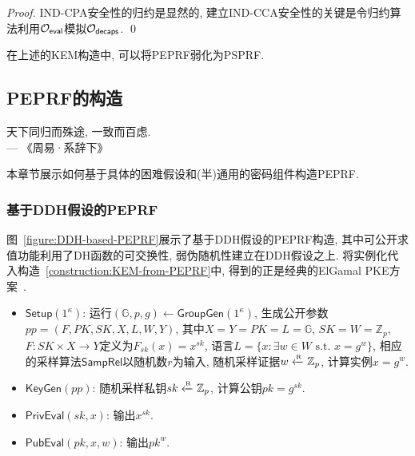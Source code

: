 \begin{proof}
IND-CPA安全性的归约是显然的, 建立IND-CCA安全性的关键是令归约算法利用$\mathcal{O}_\mathsf{eval}$模拟$\mathcal{O}_\mathsf{decaps}$. \qed
\end{proof}

\begin{remark}
在上述的KEM构造中, 可以将PEPRF弱化为PSPRF. 
\end{remark}

\subsection{PEPRF的构造}
\begin{center}
    天下同归而殊途, 一致而百虑.  \\
                \hfill --- 《周易·系辞下》
\end{center}

本章节展示如何基于具体的困难假设和(半)通用的密码组件构造PEPRF.

\subsubsection{基于DDH假设的PEPRF}
图~\ref{figure:DDH-based-PEPRF}展示了基于DDH假设的PEPRF构造, 
其中可公开求值功能利用了DH函数的可交换性, 弱伪随机性建立在DDH假设之上. 
将实例化代入构造~\ref{construction:KEM-from-PEPRF}中, 得到的正是经典的ElGamal PKE方案~\cite{ElGamal-IEEE-IT-1985}. 
\begin{construction}[基于DDH假设的PEPRF]\label{construction:DDH-based-PEPRF}
\begin{itemize}
    \item $\mathsf{Setup}(1^\kappa)$: 运行$(\mathbb{G}, p, g) \leftarrow \mathsf{GroupGen}(1^\kappa)$, 
        生成公开参数$pp = (F, PK, SK, X, L, W, Y)$, 其中$X = Y = PK = L = \mathbb{G}$, $SK = W = \mathbb{Z}_p$, 
        $F: SK \times X \rightarrow Y$定义为$F_{sk}(x) = x^{sk}$, 
        语言$L = \{x: \exists w \in W \text{~s.t.~} x = g^w\}$, 
        相应的采样算法$\mathsf{SampRel}$以随机数$r$为输入, 随机采样证据$w \xleftarrow{\textup{\tiny R}} \mathbb{Z}_p$, 计算实例$x = g^w$. 

    \item $\mathsf{KeyGen}(pp)$: 随机采样私钥$sk \xleftarrow{\textup{\tiny R}} \mathbb{Z}_p$, 计算公钥$pk = g^{sk}$. 

    \item $\mathsf{PrivEval}(sk, x)$: 输出$x^{sk}$. 

    \item $\mathsf{PubEval}(pk, x, w)$: 输出$pk^w$. 
\end{itemize} 
\end{construction}

